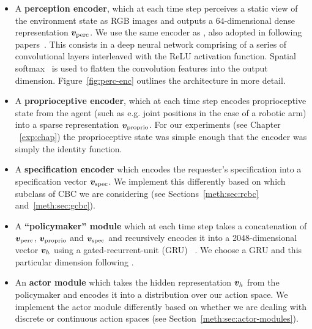 \documentclass[../main.tex]{subfiles}
\begin{document}
\begin{itemize}[leftmargin=*, label={}, itemsep=0em, partopsep=0em, topsep=1em]

	\item A \textbf{perception encoder}, which at each time step perceives a static view of the
	      environment state as RGB images and outputs a $64$-dimensional dense
	      representation $\bm v_\text{perc}$. We use the same encoder as \citet{lynch_learning_2020},
	      also adopted in following papers~\citep{lynch_language_2021, mees_calvin_2022, mees_what_2022}.
	      This consists in a deep neural network comprising of a series of convolutional layers
	      interleaved with the ReLU activation function. Spatial softmax~\citep{finn_deep_2016} is used to
	      flatten the convolution features into the output dimension. Figure~\ref{fig:perc-enc} outlines
	      the architecture in more detail.

	\item A \textbf{proprioceptive encoder}, which at each time step encodes proprioceptive state from
	      the agent (such as e.g. joint positions in the case of a robotic arm) into a sparse
	      representation $\bm v_\text{proprio}$. For our experiments (see Chapter
	      ~\ref{exp:chap}) the proprioceptive state was simple enough that the encoder was simply
	      the identity function.

	\item A \textbf{specification encoder} which encodes the requester's specification into
	      a specification vector $\bm v_\text{spec}$. We implement this differently based on which
	      subclass of CBC we are considering (see Sections~\ref{meth:sec:rcbc} and~\ref{meth:sec:gcbc}).

	\item A \textbf{``policymaker'' module} which at each time step takes a concatenation of
	      $\bm v_\text{perc}$, $\bm v_\text{proprio}$ and $\bm v_\text{spec}$ and recursively
	      encodes it  into a 2048-dimensional vector $\bm v_h$ using a gated-recurrent-unit (GRU)
	      ~\citep{cho_learning_2014}. We choose a GRU and this particular dimension following
	      \citet{mees_what_2022}.

	\item An \textbf{actor module} which takes the hidden representation $\bm v_h$ from the
	      policymaker and encodes it into a distribution over our action space. We implement the actor
	      module differently based on whether we are dealing with discrete or continuous action spaces
	      (see Section~\ref{meth:sec:actor-modules}).

\end{itemize}
\end{document}

